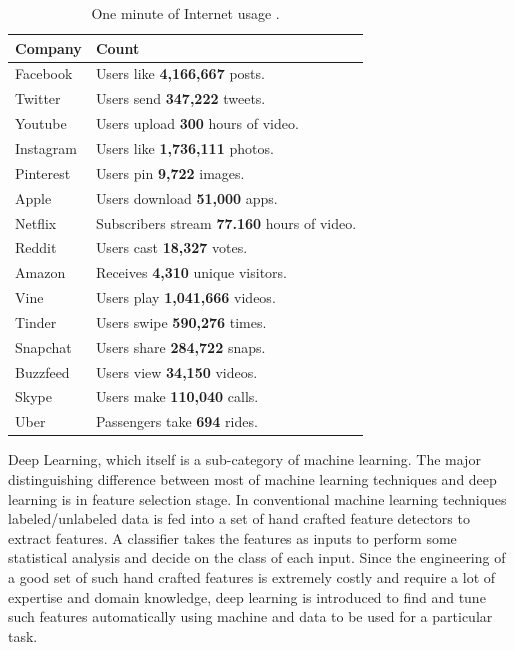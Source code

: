\documentclass[runningheads,a4paper]{llncs}
\begin{document}
\begin{table}
	\centering
	\caption{One minute of Internet usage \cite{domo}.}
	\begin{tabular}{ |p{3cm}|p{9cm}|  }
		\hline
		Company & Count \\
		\hline
		Facebook & Users like \textbf{4,166,667} posts.\\
		\hline
		Twitter & Users send \textbf{347,222} tweets.\\
		\hline
		Youtube & Users upload \textbf{300} hours of video.\\
		\hline
		Instagram & Users like \textbf{1,736,111} photos. \\
		\hline
		Pinterest & Users pin \textbf{9,722} images.\\
		\hline
		Apple & Users download  \textbf{51,000} apps.\\
		\hline
		Netflix & Subscribers stream  \textbf{77.160} hours of video.\\
		\hline
		Reddit & Users cast  \textbf{18,327} votes.\\
		\hline
		Amazon & Receives  \textbf{4,310} unique visitors.\\
		\hline
		Vine & Users play  \textbf{1,041,666} videos.\\
		\hline
		Tinder & Users swipe  \textbf{590,276} times.\\
		\hline
		Snapchat & Users share  \textbf{284,722} snaps.\\
		\hline
		Buzzfeed & Users view  \textbf{34,150} videos.\\
		\hline
		Skype & Users make  \textbf{110,040} calls.\\
		\hline
		Uber & Passengers take  \textbf{694} rides.\\
		\hline
		
	\end{tabular}
	\label{table:Domo}
\end{table}

Deep Learning, which itself is a sub-category of machine learning. The major distinguishing difference between most of machine learning techniques and deep learning is in feature selection stage. In conventional machine learning techniques labeled/unlabeled data is fed into a set of hand crafted feature detectors to extract features. A classifier takes the features as inputs to perform some statistical analysis and decide on the class of each input. Since the engineering of a good set of such hand crafted features is extremely costly and require a lot of expertise and domain knowledge, deep learning is introduced to find and tune such features automatically using machine and data to be used for a particular task.\\
\end{document}
